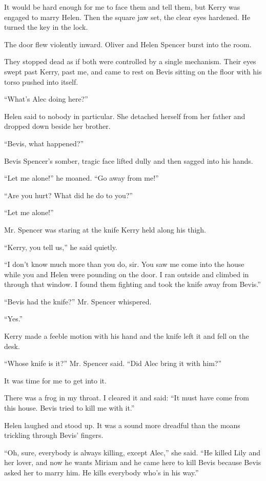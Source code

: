 \documentclass{novel}
\begin{document}
It would be hard enough for me to face them and tell them, but Kerry was engaged to marry Helen. Then the square jaw set, the clear eyes hardened. He turned the key in the lock.

The door flew violently inward. Oliver and Helen Spencer burst into the room.

\scenestars

They stopped dead as if both were controlled by a single mechanism. Their eyes swept past Kerry, past me, and came to rest on Bevis sitting on the floor with his torso pushed into itself.

“What’s Alec doing here?”

Helen said to nobody in particular. She detached \mbox{herself} from her father and dropped down beside her brother. 

“Bevis, what happened?”

Bevis Spencer’s somber, tragic face lifted dully and then sagged into his hands.

“Let me alone!” he moaned. “Go away from me!”

“Are you hurt? What did he do to you?”

“Let me alone!”

Mr. Spencer was staring at the knife Kerry held along his thigh.

“Kerry, you tell us,” he said quietly.

“I don’t know much more than you do, sir. You saw me come into the house while you and Helen were pounding on the door. I ran outside and climbed in through that window. I found them fighting and took the knife away from Bevis.”

“Bevis had the knife?” Mr. Spencer whispered.

“Yes.”

Kerry made a feeble motion with his hand and the knife left it and fell on the desk.

“Whose knife is it?” Mr. Spencer said. “Did Alec bring it with him?”

It was time for me to get into it.

There was a frog in my throat. I cleared it and said: “It must have come from this house. Bevis tried to kill me with it.”

Helen laughed and stood up. It was a sound more dreadful than the moans trickling through Bevis’ fingers.

“Oh, sure, everybody is always killing, except Alec,” she said. “He killed Lily and her lover, and now he wants Miriam and he came here to kill Bevis because Bevis asked her to marry him. He kills everybody who’s in his way.”
\end{document}
